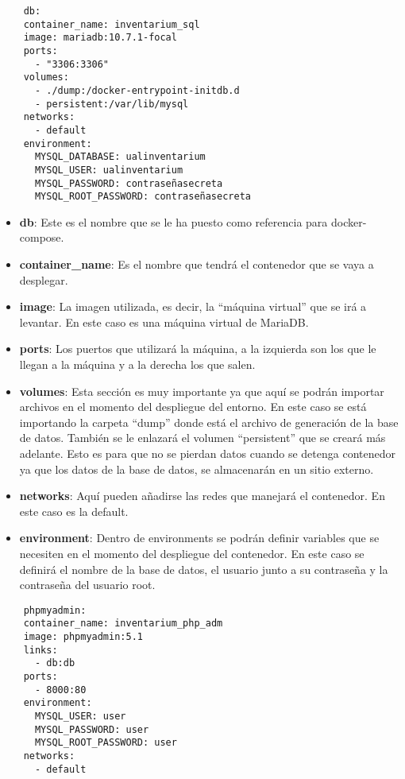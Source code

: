 \begin{verbatim}
    db:
    container_name: inventarium_sql
    image: mariadb:10.7.1-focal
    ports:
      - "3306:3306"
    volumes:
      - ./dump:/docker-entrypoint-initdb.d
      - persistent:/var/lib/mysql
    networks:
      - default
    environment:
      MYSQL_DATABASE: ualinventarium
      MYSQL_USER: ualinventarium
      MYSQL_PASSWORD: contraseñasecreta
      MYSQL_ROOT_PASSWORD: contraseñasecreta
\end{verbatim}
\begin{itemize}
    \item \textbf{db}: Este es el nombre que se le ha puesto como referencia para docker-compose.
    \item \textbf{container\_name}: Es el nombre que tendrá el contenedor que se vaya a desplegar.
    \item \textbf{image}: La imagen utilizada, es decir, la ``máquina virtual'' que se irá a levantar. En este caso es una máquina virtual de MariaDB.
    \item \textbf{ports}: Los puertos que utilizará la máquina, a la izquierda son los que le llegan a la máquina y a la derecha los que salen.
    \item \textbf{volumes}: Esta sección es muy importante ya que aquí se podrán importar archivos en el momento del despliegue del entorno. En este caso se está importando la carpeta ``dump'' donde está el archivo de generación de la base de datos. También se le enlazará el volumen ``persistent'' que se creará más adelante. Esto es para que no se pierdan datos cuando se detenga contenedor ya que los datos de la base de datos, se almacenarán en un sitio externo.
    \item \textbf{networks}: Aquí pueden añadirse las redes que manejará el contenedor. En este caso es la default.
    \item \textbf{environment}: Dentro de environments se podrán definir variables que se necesiten en el momento del despliegue del contenedor. En este caso se definirá el nombre de la base de datos, el usuario junto a su contraseña y la contraseña del usuario root.
\end{itemize}
\begin{verbatim}
    phpmyadmin:
    container_name: inventarium_php_adm
    image: phpmyadmin:5.1
    links:
      - db:db
    ports:
      - 8000:80
    environment:
      MYSQL_USER: user
      MYSQL_PASSWORD: user
      MYSQL_ROOT_PASSWORD: user
    networks:
      - default
\end{verbatim}
